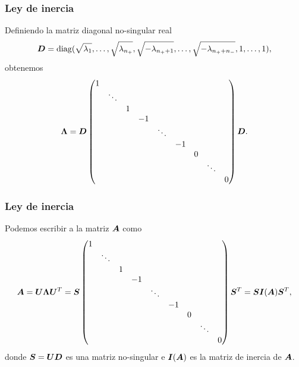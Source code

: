 \documentclass[aspectratio=169,12pt,spanish]{beamer}
\begin{document}
\begin{frame}
\frametitle{Ley de inercia}

Definiendo la matriz diagonal no-singular real
$$\bm{D} = \operatorname{diag}(\sqrt{\lambda_1}, \dots, \sqrt{\lambda_{n_+}}, \sqrt{-\lambda_{n_{+}+1}}, \dots, \sqrt{-\lambda_{n_{+}+n_{-}}}, 1, \dots, 1),$$
obtenemos
$$
\bm{\Lambda} = \bm{D} \begin{pmatrix}
1 &        &   &    &        &    &   &        &   \\
  & \ddots &   &    &        &    &   &        &   \\
  &        & 1 &    &        &    &   &        &   \\
  &        &   & -1 &        &    &   &        &   \\
  &        &   &    & \ddots &    &   &        &   \\
  &        &   &    &        & -1 &   &        &   \\
  &        &   &    &        &    & 0 &        &   \\
  &        &   &    &        &    &   & \ddots &   \\
  &        &   &    &        &    &   &        & 0 \\
\end{pmatrix}
\bm{D}.$$

\end{frame}


\begin{frame}
\frametitle{Ley de inercia}

Podemos escribir a la matriz $\bm{A}$ como
$$
\bm{A} = \bm{U} \bm{\Lambda} \bm{U}^T = \bm{S}
\begin{pmatrix}
1 &        &   &    &        &    &   &        &   \\
  & \ddots &   &    &        &    &   &        &   \\
  &        & 1 &    &        &    &   &        &   \\
  &        &   & -1 &        &    &   &        &   \\
  &        &   &    & \ddots &    &   &        &   \\
  &        &   &    &        & -1 &   &        &   \\
  &        &   &    &        &    & 0 &        &   \\
  &        &   &    &        &    &   & \ddots &   \\
  &        &   &    &        &    &   &        & 0 \\
\end{pmatrix}
\bm{S}^T = \bm{S} \bm{I}(\bm{A}) \bm{S}^T,$$
donde $\bm{S} = \bm{U} \bm{D}$ es una matriz no-singular e $\bm{I}(\bm{A})$ es la matriz de inercia de $\bm{A}$.

\end{frame}
\end{document}
